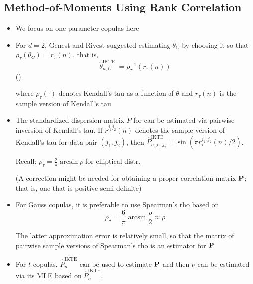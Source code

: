 \subsection*{Method-of-Moments Using Rank Correlation}
\begin{itemize}[leftmargin=*]
    \item We focus on one-parameter copulas here
    \item For $d=2$, Genest and Rivest suggested estimating $\theta_{C}$ by choosing it so that $\rho_{\tau}\left(\theta_{C}\right)=r_{\tau}(n)$, that is,
$$
\hat{\theta}_{n, C}^{\text {IKTE }}=\rho_{\tau}^{-1}\left(r_{\tau}(n)\right)
$$
()

where $\rho_{\tau}(\cdot)$ denotes Kendall's tau as a function of $\theta$ and $r_{\tau}(n)$ is the sample version of Kendall's tau

    \item The standardized dispersion matrix $P$ for  can be estimated via pairwise inversion of Kendall's tau. If $r_{\tau}^{j_{1} j_{2}}(n)$ denotes the sample version of Kendall's tau for data pair $\left(j_{1}, j_{2}\right)$, then $\hat{P}_{n, j_{1}, j_{2}}^{\mathrm{IKTE}}=\sin \left(\pi r_{\tau}^{j_{1}, j_{2}}(n) / 2\right)$.
    
    Recall: $\rho_{\tau}=\frac{2}{\pi} \arcsin \rho$ for elliptical distr. 
    
    (A correction might be needed for obtaining a proper correlation matrix $\boldsymbol{\mathbf{P}}$; that is, one that is positive semi-definite)
    
    \item For Gauss copulas, it is preferable to use Spearman's rho based on
$$
\rho_{\mathrm{S}}=\frac{6}{\pi} \arcsin \frac{\rho}{2} \approx \rho
$$

The latter approximation error is relatively small, so that the matrix of pairwise sample versions of Spearman's rho is an estimator for $\boldsymbol{\mathbf{P}}$
    \item For $t$-copulas, $\hat{P}_{n}^{\mathrm{IKTE}}$ can be used to estimate $\boldsymbol{\mathbf{P}}$ and then $\nu$ can be estimated via its MLE based on $\hat{P}_{n}^{\mathrm{IKTE}}$.
\end{itemize}











